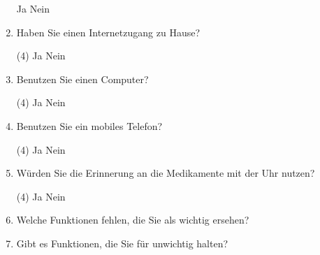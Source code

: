 \begin{enumerate}
\begin{tasks}
\task Ja
\task Nein
\end{tasks}
\item Haben Sie einen Internetzugang zu Hause?
\begin{tasks}(4)
\task Ja
\task Nein
\end{tasks}
\item Benutzen Sie einen Computer?
\begin{tasks}(4)
\task Ja
\task Nein
\end{tasks}
\item Benutzen Sie ein mobiles Telefon?
\begin{tasks}(4)
\task Ja
\task Nein
\end{tasks}
\item Würden Sie die Erinnerung an die Medikamente mit der Uhr nutzen?
\begin{tasks}(4)
\task Ja
\task Nein
\end{tasks}
\item Welche Funktionen fehlen, die Sie als wichtig ersehen?
\item Gibt es Funktionen, die Sie für unwichtig halten?
\end{enumerate}
